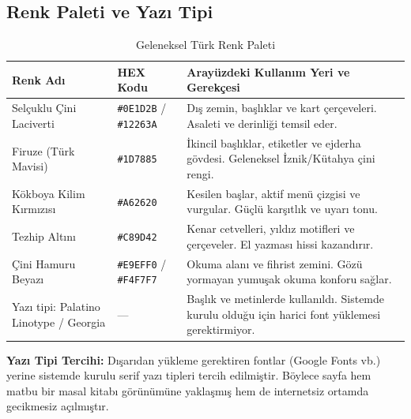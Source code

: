 \documentclass[11pt,a4paper]{article}
\begin{document}
\subsection{Renk Paleti ve Yazı Tipi}

\begin{table}[h!]
\centering
\begin{tabularx}{\textwidth}{llX}
\toprule
\textbf{Renk Adı} & \textbf{HEX Kodu} & \textbf{Arayüzdeki Kullanım Yeri ve Gerekçesi} \\
\midrule
Selçuklu Çini Laciverti & \texttt{\#0E1D2B} / \texttt{\#12263A} & Dış zemin, başlıklar ve kart çerçeveleri. Asaleti ve derinliği temsil eder. \\
Firuze (Türk Mavisi) & \texttt{\#1D7885} & İkincil başlıklar, etiketler ve ejderha gövdesi. Geleneksel İznik/Kütahya çini rengi. \\
Kökboya Kilim Kırmızısı & \texttt{\#A62620} & Kesilen başlar, aktif menü çizgisi ve vurgular. Güçlü karşıtlık ve uyarı tonu. \\
Tezhip Altını & \texttt{\#C89D42} & Kenar cetvelleri, yıldız motifleri ve çerçeveler. El yazması hissi kazandırır. \\
Çini Hamuru Beyazı & \texttt{\#E9EFF0} / \texttt{\#F4F7F7} & Okuma alanı ve fihrist zemini. Gözü yormayan yumuşak okuma konforu sağlar. \\
Yazı tipi: Palatino Linotype / Georgia & --- & Başlık ve metinlerde kullanıldı. Sistemde kurulu olduğu için harici font yüklemesi gerektirmiyor. \\
\bottomrule
\end{tabularx}
\caption{Geleneksel Türk Renk Paleti}
\end{table}

\textbf{Yazı Tipi Tercihi:} Dışarıdan yükleme gerektiren fontlar (Google Fonts vb.) yerine sistemde kurulu serif yazı tipleri tercih edilmiştir. Böylece sayfa hem matbu bir masal kitabı görünümüne yaklaşmış hem de internetsiz ortamda gecikmesiz açılmıştır.
\end{document}
